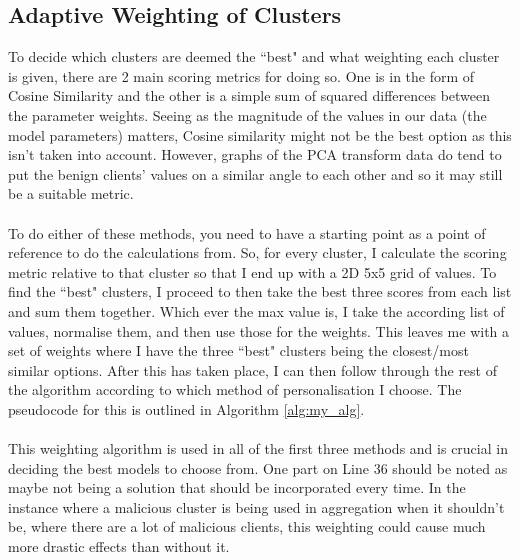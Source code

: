 \subsection{Adaptive Weighting of Clusters}
To decide which clusters are deemed the ``best" and what weighting each cluster is given, there are 2 main scoring metrics for doing so.
One is in the form of Cosine Similarity and the other is a simple sum of squared differences between the parameter weights.
Seeing as the magnitude of the values in our data (the model parameters) matters, Cosine similarity might not be the best option as this isn't taken into account.
However, graphs of the PCA transform data do tend to put the benign clients' values on a similar angle to each other and so it may still be a suitable metric.
\\ \\
To do either of these methods, you need to have a starting point as a point of reference to do the calculations from.
So, for every cluster, I calculate the scoring metric relative to that cluster so that I end up with a 2D 5x5 grid of values.
To find the ``best" clusters, I proceed to then take the best three scores from each list and sum them together.
Which ever the max value is, I take the according list of values, normalise them, and then use those for the weights.
This leaves me with a set of weights where I have the three ``best" clusters being the closest/most similar options.
After this has taken place, I can then follow through the rest of the algorithm according to which method of personalisation I choose.
The pseudocode for this is outlined in Algorithm \ref{alg:my_alg}.
\\ \\
This weighting algorithm is used in all of the first three methods and is crucial in deciding the best models to choose from.
One part on Line 36 should be noted as maybe not being a solution that should be incorporated every time.
In the instance where a malicious cluster is being used in aggregation when it shouldn't be, where there are a lot of malicious clients, this weighting could cause much more drastic effects than without it.
\\ \\


